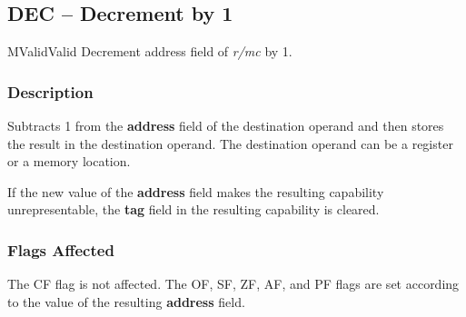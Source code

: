 \clearpage
{}
{}
\subsection*{DEC -- Decrement by 1}

\begin{x86opcodetable}
  {M}{Valid}{Valid}
  {Decrement address field of \emph{r/mc} by 1.}
\end{x86opcodetable}

\begin{x86opentable}
\end{x86opentable}

\subsubsection*{Description}

Subtracts 1 from the \textbf{address} field of the destination operand
and then stores the result in the destination operand. The destination
operand can be a register or a memory location.

If the new value of the \textbf{address} field makes the resulting
capability unrepresentable, the \textbf{tag} field in the resulting
capability is cleared.

\subsubsection*{Flags Affected}

The CF flag is not affected.  The OF, SF, ZF, AF, and PF flags are set
according to the value of the resulting \textbf{address} field.
